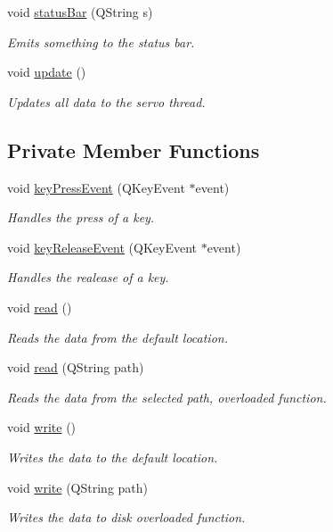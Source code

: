 \begin{DoxyCompactItemize}
void \hyperlink{a00005_a22eed58c97536fba6f7b3576ba5a5906}{status\+Bar} (Q\+String s)
\begin{DoxyCompactList}\small\item\em Emits something to the status bar. \end{DoxyCompactList}\item 
void \hyperlink{a00005_a128f71880d4b9683149023fc46fcc9f8}{update} ()
\begin{DoxyCompactList}\small\item\em Updates all data to the servo thread. \end{DoxyCompactList}\end{DoxyCompactItemize}
\subsection*{Private Member Functions}
\begin{DoxyCompactItemize}
\item 
void \hyperlink{a00005_a9c4f542263838b9ecd06eae839a42a34}{key\+Press\+Event} (Q\+Key\+Event $\ast$event)
\begin{DoxyCompactList}\small\item\em Handles the press of a key. \end{DoxyCompactList}\item 
void \hyperlink{a00005_a6a706e2f733f701fe87e82e77294a035}{key\+Release\+Event} (Q\+Key\+Event $\ast$event)
\begin{DoxyCompactList}\small\item\em Handles the realease of a key. \end{DoxyCompactList}\item 
void \hyperlink{a00005_a38fedeca39a4222060bec372245169cc}{read} ()
\begin{DoxyCompactList}\small\item\em Reads the data from the default location. \end{DoxyCompactList}\item 
void \hyperlink{a00005_a1d72fb0103b6ac7cff959bc389e2c054}{read} (Q\+String path)
\begin{DoxyCompactList}\small\item\em Reads the data from the selected path, overloaded function. \end{DoxyCompactList}\item 
void \hyperlink{a00005_a6fd62e117414acda4fe6a93c453dfb93}{write} ()
\begin{DoxyCompactList}\small\item\em Writes the data to the default location. \end{DoxyCompactList}\item 
void \hyperlink{a00005_aa1362f75c2c485c0094c564256182641}{write} (Q\+String path)
\begin{DoxyCompactList}\small\item\em Writes the data to disk overloaded function. \end{DoxyCompactList}\end{DoxyCompactItemize}
